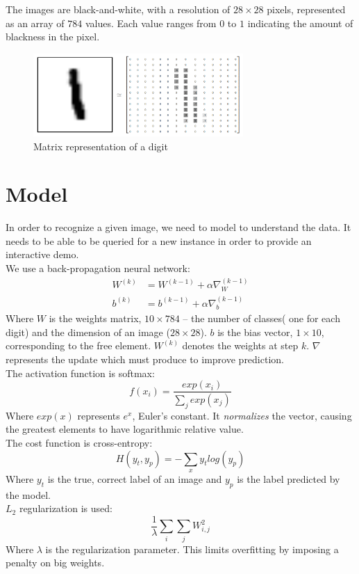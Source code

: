 \documentclass[a4paper]{article}
\begin{document}
The images are black-and-white, with a resolution of $28 \times 28$ pixels, represented as an array of $784$ values. Each value ranges from $0$ to $1$ indicating the amount of blackness in the pixel.

\begin{figure}[htb]
\centering
\includegraphics[width=8cm]{images/mnist-matrix.png}
\caption{Matrix representation of a digit \cite{tf}}
\end{figure}


\newpage
\section{Model}
\label{sec:model}
In order to recognize a given image, we need to model to understand the data. It needs to be able to be queried for a new instance in order to provide an interactive demo.
\\

We use a back-propagation neural network:
\begin{align*}
W^{(k)} &= W^{(k-1)} + \alpha \nabla_W^{(k-1)} \\ 
b^{(k)} &= b^{(k-1)} + \alpha \nabla_b^{(k-1)}
\end{align*}
Where $W$ is the weights matrix, $10 \times 784$ -- the number of classes( one for each digit) and the dimension of an image ($28 \times 28$). $b$ is the bias vector, $1 \times 10$, corresponding to the free element. $W^{(k)}$ denotes the weights at step $k$. $\nabla$ represents the update which must produce to improve prediction.
\\

The activation function is softmax:
$$f(x_i)=\frac{exp(x_i)}{\sum_j exp(x_j)}$$
Where $exp(x)$ represents $e^x$, Euler's constant. It \textit{normalizes} the vector, causing the greatest elements to have logarithmic relative value.
\\

The cost function is cross-entropy:
$$H(y_t, y_p)=-\sum_x y_t log(y_p)$$
Where $y_t$ is the true, correct label of an image and $y_p$ is the label predicted by the model.
\\

$L_2$ regularization is used:
$$\frac{1}{\lambda} \sum_i \sum_j W_{i,j}^2$$
Where $\lambda$ is the regularization parameter. This limits overfitting by imposing a penalty on big weights.
\\
\end{document}
